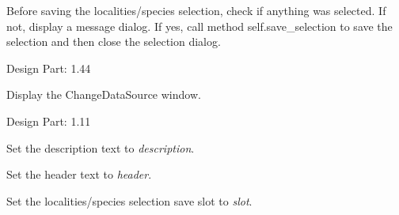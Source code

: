 \documentclass[letterpaper,10pt,english]{sphinxmanual}
\begin{document}
\begin{fulllineitems}
\begin{fulllineitems}
\end{fulllineitems}


\begin{fulllineitems}
\label{setlyze/gui:setlyze.gui.SelectionWindow.on_continue}
Before saving the localities/species selection, check if
anything was selected. If not, display a message dialog. If yes,
call method self.save\_selection to save the selection and then
close the selection dialog.

Design Part: 1.44

\end{fulllineitems}


\begin{fulllineitems}
\label{setlyze/gui:setlyze.gui.SelectionWindow.on_select_data_files}
Display the ChangeDataSource window.

Design Part: 1.11

\end{fulllineitems}


\begin{fulllineitems}
\label{setlyze/gui:setlyze.gui.SelectionWindow.set_description}
Set the description text to \emph{description}.

\end{fulllineitems}


\begin{fulllineitems}
\label{setlyze/gui:setlyze.gui.SelectionWindow.set_header}
Set the header text to \emph{header}.

\end{fulllineitems}


\begin{fulllineitems}
\label{setlyze/gui:setlyze.gui.SelectionWindow.set_save_slot}
Set the localities/species selection save slot to \emph{slot}.


\end{fulllineitems}
\end{fulllineitems}
\end{document}
